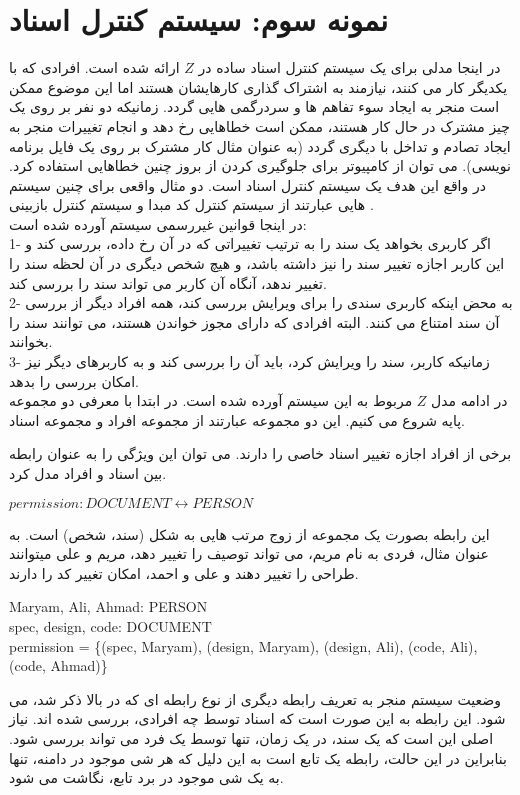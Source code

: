  \section{نمونه سوم: سیستم کنترل اسناد} 
 در اینجا مدلی برای یک سیستم کنترل اسناد ساده در $Z$ ارائه شده است. افرادی که با یکدیگر کار می کنند، نیازمند به اشتراک گذاری کارهایشان هستند اما این موضوع ممکن است منجر به ایجاد سوء تفاهم ها و سردرگمی هایی گردد. زمانیکه دو نفر بر روی یک چیز مشترک در حال کار هستند، ممکن است خطاهایی رخ دهد و انجام تغییرات منجر به ایجاد تصادم و تداخل با دیگری گردد (به عنوان مثال کار مشترک بر روی یک فایل برنامه نویسی). می توان از کامپیوتر برای جلوگیری کردن از بروز چنین خطاهایی استفاده کرد. در واقع این هدف یک سیستم کنترل اسناد است. دو مثال واقعی برای چنین سیستم هایی عبارتند از سیستم کنترل کد مبدا
 و سیستم کنترل بازبینی
 .
 \\
 در اینجا قوانین غیررسمی سیستم آورده شده است:
 \\
1- اگر کاربری بخواهد یک سند را به ترتیب تغییراتی که در آن رخ داده، بررسی کند و این کاربر اجازه تغییر سند را نیز داشته باشد، و هیچ شخص دیگری در آن لحظه سند را تغییر ندهد، آنگاه آن کاربر می تواند سند را بررسی کند.
\\
2- به محض اینکه کاربری سندی را برای ویرایش بررسی کند، همه افراد دیگر از بررسی آن سند امتناع می کنند. البته افرادی که دارای مجوز خواندن هستند، می توانند سند را بخوانند.
\\
3- زمانیکه کاربر، سند را ویرایش کرد، باید آن را بررسی کند و به کاربرهای دیگر نیز امکان بررسی را بدهد.
\\
در ادامه مدل $Z$ مربوط به این سیستم آورده شده است. در ابتدا با معرفی دو مجموعه پایه شروع می کنیم. این دو مجموعه عبارتند از مجموعه افراد و مجموعه اسناد.
\begin{LTR}
\end{LTR}
برخی از افراد اجازه تغییر اسناد خاصی را دارند. می توان این ویژگی را به عنوان رابطه بین اسناد و افراد مدل کرد.
\begin{LTR}
$permission: DOCUMENT \leftrightarrow PERSON $
\end{LTR}
این رابطه بصورت یک مجموعه از زوج مرتب هایی به شکل (سند، شخص) است. به عنوان مثال، فردی به نام مریم، می تواند توصیف را تغییر دهد، مریم و علی میتوانند طراحی را تغییر دهند و علی و احمد، امکان تغییر کد را دارند.
\begin{LTR}
Maryam, Ali, Ahmad: PERSON
\\
spec, design, code: DOCUMENT
\\
permission = \{(spec, Maryam), (design, Maryam), (design, Ali), (code, Ali), (code, Ahmad)\}
\end{LTR}
وضعیت سیستم منجر به تعریف رابطه دیگری از نوع رابطه ای که در بالا ذکر شد، می شود. این رابطه به این صورت است که اسناد توسط چه افرادی، بررسی شده اند. نیاز اصلی این است که یک سند، در یک زمان، تنها توسط یک فرد می تواند بررسی شود. بنابراین در این حالت، رابطه یک تابع است به این دلیل که هر شی موجود در دامنه، تنها به یک شی موجود در برد تابع، نگاشت می شود. 
  
